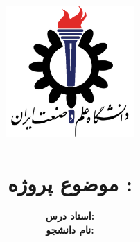 \title{
    \center
    \includegraphics[width=5cm, height=5cm]{images/IUST_logo_color.png} \\

\CourseName \\[20pt]

موضوع پروژه : 
\PickedSubject  \\
}

\author{
    \textbf{استاد درس:}
    \Instructor \\[10pt]
    \textbf{نام دانشجو:}
    \Student \\[10pt]
}

\date{\Semester}


